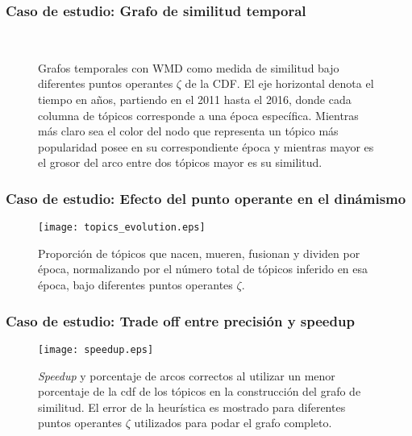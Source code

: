 \documentclass[
	spanish, %
	aspectratio=43, %
	hyperref={pdfencoding=auto,psdextra},
	xcolor={dvipsnames,table,usenames},
]{beamer}
\begin{document}
\begin{frame}[t]
\frametitle{Caso de estudio: Grafo de similitud temporal}

\vspace*{-0.2in}
\begin{figure}
\\
\caption{Grafos temporales con WMD como medida de similitud bajo diferentes puntos operantes $\zeta$ de la CDF. El eje horizontal denota el tiempo en años, partiendo en el 2011 hasta el 2016, donde cada columna de tópicos corresponde a una época específica. Mientras más claro sea el color del nodo que representa un tópico más popularidad posee en su correspondiente época y mientras mayor es el grosor del arco entre dos tópicos mayor es su similitud.}
\label{img:temporal_similarity_graphs}
\end{figure}

\end{frame}


\begin{frame}[t]
\frametitle{Caso de estudio: Efecto del punto operante en el dinámismo}

\begin{figure}

\vspace*{-0.2in}
\texttt{[image: topics\_evolution.eps]}
\caption{Proporción de tópicos que nacen, mueren, fusionan y dividen por época, normalizando por el número total de tópicos inferido en esa época, bajo diferentes puntos operantes $\zeta$.}
\label{img:topics_evolution}
\end{figure}

\end{frame}


\begin{frame}[t]
\frametitle{Caso de estudio: Trade off entre precisión y speedup}
 
\vspace*{-0.2in}
\begin{figure}
\texttt{[image: speedup.eps]}
\caption{\textit{Speedup} y porcentaje de arcos correctos al utilizar un menor porcentaje de la cdf de los tópicos en la construcción del grafo de similitud. El error de la heurística es mostrado para diferentes puntos operantes $\zeta$ utilizados para podar el grafo completo.} 
\label{img:speedup}
\end{figure}

\end{frame}
\end{document}
